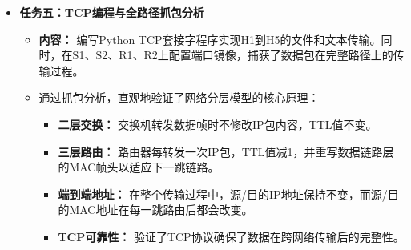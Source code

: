 \documentclass[12pt, a4paper]{article}
\begin{document}
\begin{itemize}
    \item \textbf{任务五：TCP编程与全路径抓包分析}
    \begin{itemize}
        \item \textbf{内容：} 编写Python TCP套接字程序实现H1到H5的文件和文本传输。同时，在S1、S2、R1、R2上配置端口镜像，捕获了数据包在完整路径上的传输过程。
        \item 通过抓包分析，直观地验证了网络分层模型的核心原理：
        \begin{itemize}
            \item \textbf{二层交换：} 交换机转发数据帧时不修改IP包内容，TTL值不变。
            \item \textbf{三层路由：} 路由器每转发一次IP包，TTL值减1，并重写数据链路层的MAC帧头以适应下一跳链路。
            \item \textbf{端到端地址：} 在整个传输过程中，源/目的IP地址保持不变，而源/目的MAC地址在每一跳路由后都会改变。
            \item \textbf{TCP可靠性：} 验证了TCP协议确保了数据在跨网络传输后的完整性。
        \end{itemize}
    \end{itemize}
\end{itemize}
\end{document}
